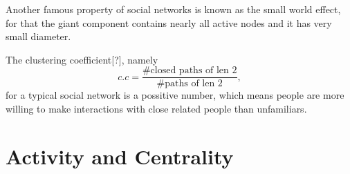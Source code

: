 \documentclass[12pt,abstract=true]{scrartcl}
\numberwithin{equation}{section}
\theoremstyle{definition}   \newtheorem{definition}{Definition}[section]
\theoremstyle{plain}        \newtheorem{theorem}{Theorem}[section]
\theoremstyle{plain}        \newtheorem{observation}{Observation}[section]
\theoremstyle{plain}        \newtheorem{fact}{Fact}[section]
\theoremstyle{plain}        \newtheorem{claim}{Claim}[section]
\theoremstyle{plain}        \newtheorem{lemma}[theorem]{Lemma}
\theoremstyle{plain}        \newtheorem{corollary}[theorem]{Corollary}
\theoremstyle{remark}       \newtheorem{example}{Example}[section]
\theoremstyle{remark}       \newtheorem{remark}{Remark}[section]
\begin{document}
Another famous property of social networks is known as the small world
effect\cite{buchanan2003nexus}, for that the giant component contains nearly
all active nodes and it has very small diameter.

The clustering coefficient[?], namely
\begin{equation}
c.c=\frac{\#\text{closed paths of len 2}}{\#\text{paths of len 2}},
\end{equation}
for a typical social network is a possitive
number, which means people are more willing to make interactions with close
related people than unfamiliars. 

\section{Activity and Centrality}
\end{document}
